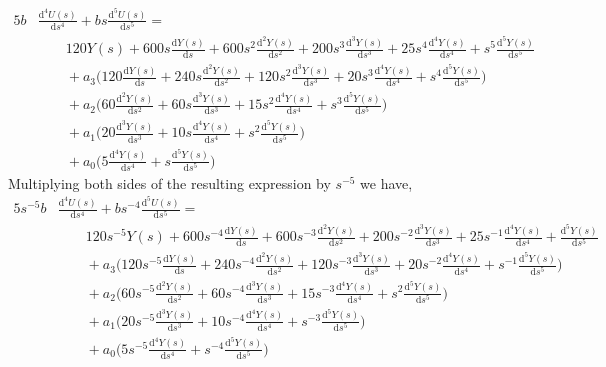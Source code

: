 \documentclass[letterpaper%
, twoside%
, 12pt%
,memoire%
, english%
,creativecommons,hyperref%
]{thETS}
\theoremstyle{newThmStyle}
\begin{document}
\begin{equation}\label{eqn.32}
\begin{split}
5b&\frac{\mathrm{d}^4U(s)}{\mathrm{d}s^4} + bs\frac{\mathrm{d}^5U(s)}{\mathrm{d}s^5} = \\ 
&\qquad{}120Y(s) + 600s\frac{\mathrm{d}Y(s)}{\mathrm{d}s} + 600s^2\frac{\mathrm{d}^2Y(s)}{\mathrm{d}s^2} + 200s^3\frac{\mathrm{d}^3Y(s)}{\mathrm{d}s^3} + 25s^4\frac{\mathrm{d}^4Y(s)}{\mathrm{d}s^4} + s^5 \frac{\mathrm{d}^5Y(s)}{\mathrm{d}s^5} \, \\
&\qquad{}+ a_3\bigg(120\frac{\mathrm{d}Y(s)}{\mathrm{d}s} + 240s\frac{\mathrm{d}^2Y(s)}{\mathrm{d}s^2} + 120s^2\frac{\mathrm{d}^3Y(s)}{\mathrm{d}s^3} + 20s^3\frac{\mathrm{d}^4Y(s)}{\mathrm{d}s^4} + s^4 \frac{\mathrm{d}^5Y(s)}{\mathrm{d}s^5}\bigg) \, \\
&\qquad{}+ a_2\bigg(60\frac{\mathrm{d}^2Y(s)}{\mathrm{d}s^2} + 60s\frac{\mathrm{d}^3Y(s)}{\mathrm{d}s^3} + 15s^2\frac{\mathrm{d}^4Y(s)}{\mathrm{d}s^4} + s^3\frac{\mathrm{d}^5Y(s)}{\mathrm{d}s^5} \bigg) \, \\  
&\qquad{}+ a_1\bigg(20\frac{\mathrm{d}^3Y(s)}{\mathrm{d}s^3} + 10s\frac{\mathrm{d}^4Y(s)}{\mathrm{d}s^4} + s^2\frac{\mathrm{d}^5Y(s)}{\mathrm{d}s^5} \bigg) \, \\
&\qquad{}+ a_0\bigg(5\frac{\mathrm{d}^4Y(s)}{\mathrm{d}s^4} + s\frac{\mathrm{d}^5Y(s)}{\mathrm{d}s^5} \bigg)
\end{split}
\end{equation}
Multiplying both sides of the resulting expression by $s^{-5}$ we have,
\begin{equation}\label{eqn.33}
\begin{split}
5s^{-5}b&\frac{\mathrm{d}^4U(s)}{\mathrm{d}s^4} + bs^{-4}\frac{\mathrm{d}^5U(s)}{\mathrm{d}s^5} = \\
&\qquad{}120s^{-5}Y(s) + 600s^{-4}\frac{\mathrm{d}Y(s)}{\mathrm{d}s} + 600s^{-3}\frac{\mathrm{d}^2Y(s)}{\mathrm{d}s^2} + 200s^{-2}\frac{\mathrm{d}^3Y(s)}{\mathrm{d}s^3} + 25s^{-1}\frac{\mathrm{d}^4Y(s)}{\mathrm{d}s^4} + \frac{\mathrm{d}^5Y(s)}{\mathrm{d}s^5} \, \\
&\qquad{}+ a_3\bigg(120s^{-5}\frac{\mathrm{d}Y(s)}{\mathrm{d}s} + 240s^{-4}\frac{\mathrm{d}^2Y(s)}{\mathrm{d}s^2} + 120s^{-3}\frac{\mathrm{d}^3Y(s)}{\mathrm{d}s^3} + 20s^{-2}\frac{\mathrm{d}^4Y(s)}{\mathrm{d}s^4} + s^{-1} \frac{\mathrm{d}^5Y(s)}{\mathrm{d}s^5}\bigg) \, \\
&\qquad{}+ a_2\bigg(60s^{-5}\frac{\mathrm{d}^2Y(s)}{\mathrm{d}s^2} + 60s^{-4}\frac{\mathrm{d}^3Y(s)}{\mathrm{d}s^3} + 15s^{-3}\frac{\mathrm{d}^4Y(s)}{\mathrm{d}s^4} + s^{2}\frac{\mathrm{d}^5Y(s)}{\mathrm{d}s^5} \bigg) \, \\  
&\qquad{}+ a_1\bigg(20s^{-5}\frac{\mathrm{d}^3Y(s)}{\mathrm{d}s^3} + 10s^{-4}\frac{\mathrm{d}^4Y(s)}{\mathrm{d}s^4} + s^{-3}\frac{\mathrm{d}^5Y(s)}{\mathrm{d}s^5} \bigg) \, \\
&\qquad{}+ a_0\bigg(5s^{-5}\frac{\mathrm{d}^4Y(s)}{\mathrm{d}s^4} + s^{-4}\frac{\mathrm{d}^5Y(s)}{\mathrm{d}s^5} \bigg)
\end{split}
\end{equation}
\end{document}
